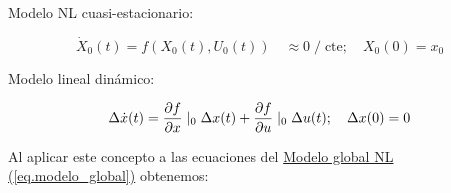 \documentclass{article}
\begin{document}
Modelo NL cuasi-estacionario:

\begin{equation}
    \dot{X}_{0}(t) = f(X_{0}(t), U_{0}(t)) \quad \approx 0 \;/\; \text{cte}; \quad X_{0}(0) = x_{0}
\end{equation}

Modelo lineal dinámico:

\begin{equation}
    \Delta\dot{x}(t) = \frac{\partial f}{\partial x}\mid_{0}\Delta x(t) + \frac{\partial f}{\partial u}\mid_{0}\Delta u(t); \quad \Delta x(0) = 0\\
\end{equation}

Al aplicar este concepto a las ecuaciones del
\hyperref[eq.modelo_global]{Modelo global NL (\ref*{eq.modelo_global})}
obtenemos:
\end{document}
